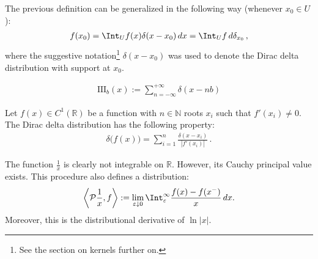 	\begin{property}\label{distribution:sieving_dirac_delta}
    	The previous definition can be generalized in the following way (whenever $x_0\in U$):
    	\begin{gather}
			f(x_0) = \Int_Uf(x)\delta(x - x_0)\,dx=\Int_Uf\,d\delta_{x_0}\,,
		\end{gather}
		where the suggestive notation\footnote{See the section on kernels further on.} $\delta(x-x_0)$ was used to denote the Dirac delta distribution with support at $x_0$.
	\end{property}

	\begin{definition}\label{distribution:dirac_comb}
    	\begin{gather}
			\mathrm{III}_b(x) := \sum_{n=-\infty}^{+\infty}\delta(x-nb)
		\end{gather}
	\end{definition}

	\begin{property}[Transformation]\label{distribution:delta_of_function}
		Let $f(x)\in C^1(\mathbb{R})$ be a function with $n\in\mathbb{N}$ roots $x_i$ such that $f'(x_i)\neq0$. The Dirac delta distribution has the following property:
		\begin{gather}
			\delta\bigl(f(x)\bigr) = \sum_{i=1}^n\frac{\delta(x-x_i)}{|f'(x_i)|}\,.
		\end{gather}
	\end{property}


    \begin{example}
        The function $\frac{1}{x}$ is clearly not integrable on $\mathbb{R}$. However, its Cauchy principal value exists. This procedure also defines a distribution:
        \begin{gather}
            \left\langle\mathcal{P}\frac{1}{x},f\right\rangle := \lim_{\varepsilon\downarrow0}\Int_\varepsilon^\infty\frac{f(x)-f(x^-)}{x}\,dx.
        \end{gather}
        Moreover, this is the distributional derivative of $\ln|x|$.
    \end{example}

